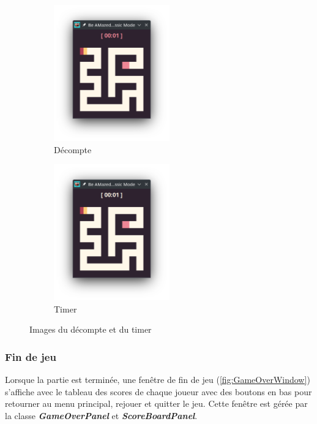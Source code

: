 \begin{figure}[!htb]%
    \centering
    \begin{subfigure}{5cm}
        \includegraphics[width=5cm]{ressources/Implementation/Labyrinthe/Vue/CountdownTimer/CountDown.png}%
        \caption{Décompte}
        \label{fig:Countdown}
    \end{subfigure}
    \qquad
    \begin{subfigure}{5cm}
        \includegraphics[width=5cm]{ressources/Implementation/Labyrinthe/Vue/CountdownTimer/Timer.png}%
        \caption{Timer}
        \label{fig:Timer}
    \end{subfigure}
    \caption{Images du décompte et du timer}%
    \label{fig:CountdownAndTimer}
\end{figure}
\FloatBarrier

\subsubsection*{Fin de jeu}

Lorsque la partie est terminée, une fenêtre de fin de jeu (\ref{fig:GameOverWindow}) s'affiche avec le tableau des scores de chaque joueur avec des boutons en bas pour retourner au menu principal, rejouer et quitter le jeu. Cette fenêtre est gérée par la classe \textbf{\textit{GameOverPanel}} et \textbf{\textit{ScoreBoardPanel}}.

